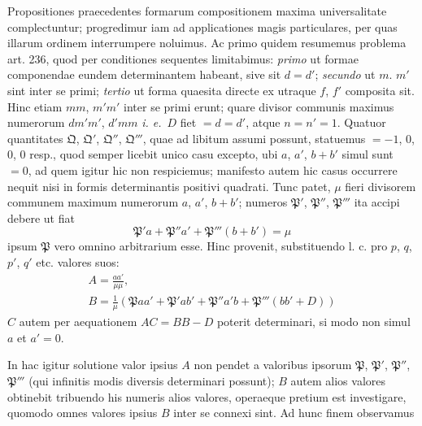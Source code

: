 Propositiones praecedentes formarum compositionem maxima universalitate complectuntur; progredimur iam ad applicationes magis particulares, per quas illarum ordinem interrumpere noluimus. Ac primo quidem resumemus problema art. 236, quod per conditiones sequentes limitabimus: \textit{primo} ut formae componendae eundem determinantem habeant, sive sit $d=d'$; \textit{secundo} ut $m$. $m'$ sint inter se primi; \textit{tertio} ut forma quaesita directe ex utraque $f$, $f'$ composita sit. Hinc etiam $mm$, $m'm'$ inter se primi erunt; quare divisor communis maximus numerorum $dm'm'$, $d'mm$ \textit{i. e.}\ $D$ fiet $=d=d'$, atque $n=n'=1$. Quatuor quantitates $\mathfrak{Q}$, $\mathfrak{Q}'$, $\mathfrak{Q}''$, $\mathfrak{Q}'''$, quae ad libitum assumi possunt, statuemus $=-1$, $0$, $0$, $0$ resp., quod semper licebit unico casu excepto, ubi $a$, $a'$, $b+b'$ simul sunt $=0$, ad quem igitur hic non respiciemus; manifesto autem hic casus occurrere nequit nisi in formis determinantis positivi quadrati. Tunc patet, $\mu$ fieri divisorem communem maximum numerorum $a$, $a'$, $b+b'$; numeros $\mathfrak{P}'$, $\mathfrak{P}''$, $\mathfrak{P}'''$ ita accipi debere ut fiat
\[
\mathfrak{P}'a+\mathfrak{P}''a'+\mathfrak{P}'''(b+b')=\mu
\]
ipsum $\mathfrak{P}$ vero omnino arbitrarium esse. Hinc provenit, substituendo l. c. pro $p$, $q$, $p'$, $q'$ etc. valores suos:
\[
\begin{gathered}A=\frac{aa'}{\mu\mu},\\ B=\frac{1}{\mu}(\mathfrak{P}aa'+\mathfrak{P}'ab'+\mathfrak{P}''a'b+\mathfrak{P}'''(bb'+D))\end{gathered}
\]
$C$ autem per aequationem $AC=BB-D$ poterit determinari, si modo non simul $a$ et $a'=0$.

In hac igitur solutione valor ipsius $A$ non pendet a valoribus ipsorum $\mathfrak{P}$, $\mathfrak{P}'$, $\mathfrak{P}''$, $\mathfrak{P}'''$ (qui infinitis modis diversis determinari possunt); $B$ autem alios valores obtinebit tribuendo his numeris alios valores, operaeque pretium est investigare, quomodo omnes valores ipsius $B$ inter se connexi sint. Ad hunc finem observamus

